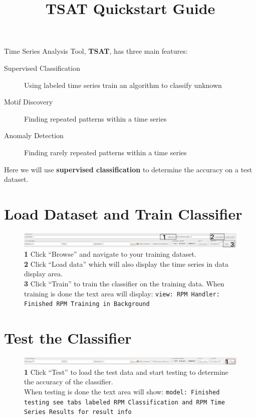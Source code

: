 \documentclass[letterpaper, 12pt]{article}
\date{}
\newcommand\TSAT{\textbf{TSAT}}
\begin{document}
\title{TSAT Quickstart Guide}
\maketitle
\noindent
Time Series Analysis Tool, \TSAT, has three main features:
\begin{description}
	\item[Supervised Classification] Using labeled time series train an algorithm to classify unknown
	\item[Motif Discovery] Finding repeated patterns within a time series
	\item[Anomaly Detection] Finding rarely repeated patterns within a time series
\end{description}
Here we will use \textbf{supervised classification} to determine the accuracy on a test dataset.

\section{Load Dataset and Train Classifier}
\vspace{-.6em}
\begin{figure}[H]
	\includegraphics[width=\textwidth]{quickstartpics/trainfull}
	\textbf{1} Click ``Browse'' and navigate to your training dataset.\\ \textbf{2} Click ``Load data'' which will also display the time series in data display area.\\ \textbf{3} Click ``Train'' to train the classifier on the training data.  When training is done the text area will display: \texttt{view: RPM Handler: Finished RPM Training in Background}
	\label{fig:browseload}
\end{figure}

\section{Test the Classifier}
\vspace{-.6em}
\begin{figure}[H]
	\includegraphics[width=\textwidth]{quickstartpics/test}
	 \textbf{1} Click ``Test'' to load the test data and start testing to determine the accuracy of the classifier.
	 \\When testing is done the text area will show: \texttt{model: Finished testing see tabs labeled RPM Classification and RPM Time Series Results for result info}
	\label{fig:test}
\end{figure}
\end{document}
